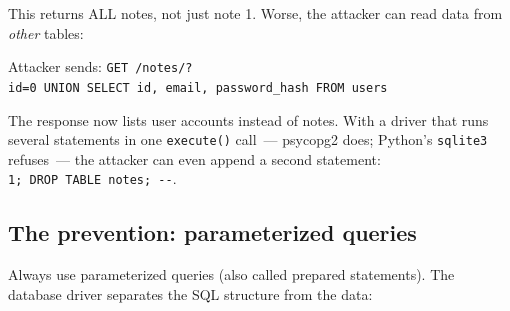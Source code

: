 \noindent{}This returns ALL notes, not just note 1. Worse, the attacker can read data from \emph{other} tables:

Attacker sends: \texttt{GET\ /}\allowbreak{}\texttt{notes/}\allowbreak{}\texttt{?}\allowbreak{}\texttt{id=}\allowbreak{}\texttt{0\ UNION\ SELECT\ id,}\allowbreak{}\texttt{\ email,}\allowbreak{}\texttt{\ password\_}\allowbreak{}\texttt{hash\ FROM\ users}

\begin{codebox}[short]

\begin{Shaded}
\begin{Highlighting}[]
 \OperatorTok{*}   \OperatorTok{=}    
\end{Highlighting}
\end{Shaded}

\end{codebox}

\noindent{}The response now lists user accounts instead of notes. With a driver that runs several statements in one \texttt{execute()} call~--- psycopg2 does; Python's \texttt{sqlite3} refuses~--- the attacker can even append a second statement: \texttt{1;\ DROP\ TABLE\ notes;\ -\/-}.

\subsection*{The prevention: parameterized queries}\label{31-input-handling:the-prevention-parameterized-queries}

Always use parameterized queries (also called prepared statements). The database driver separates the SQL structure from the data:

\begin{codebox}[short]

\begin{Shaded}
\begin{Highlighting}[]
\OperatorTok{=} \NormalTok{, }\NormalTok{))}
    \NormalTok{,}
\NormalTok{)}
\end{Highlighting}
\end{Shaded}

\end{codebox}

